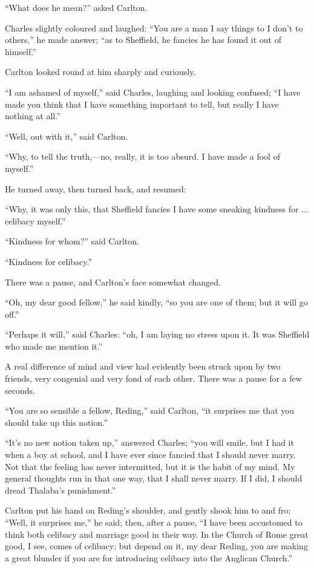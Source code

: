``What does he mean?'' asked Carlton.

Charles slightly coloured and laughed: ``You are a man I say
things to I don't to others,'' he made answer; ``as to
Sheffield, he fancies he has found it out of himself.''

Carlton looked round at him sharply and curiously.

``I am ashamed of myself,'' said Charles, laughing and
looking confused; ``I have made you think that I have something
important to tell, but really I have nothing at all.''

``Well, out with it,'' said Carlton.

``Why, to tell the truth,—no, really, it is too absurd. I
have made a fool of myself.''

He turned away, then turned back, and resumed:

``Why, it was only this, that Sheffield fancies I have some
sneaking kindness for ... celibacy myself.''

``Kindness for whom?'' said Carlton.

``Kindness for celibacy.''

There was a pause, and Carlton's face somewhat changed.

``Oh, my dear good fellow,'' he said kindly, ``so you
are one of them; but it will go off.''

``Perhaps it will,'' said Charles: ``oh, I am laying no
stress upon it. It was Sheffield who made me mention it.''

A real difference of mind and view had evidently been struck upon
by two friends, very congenial and very fond of each other. There was
a pause for a few seconds.

``You are so sensible a fellow, Reding,'' said Carlton,
``it surprises me that you should take up this notion.''

``It's no new notion taken up,'' answered Charles;
``you will smile, but I had it when a boy at school, and I have
ever since fancied that I should never marry. Not that the feeling has
never intermitted, but it is the habit of my mind. My general thoughts
run in that one way, that I shall never marry. If I did, I should
dread Thalaba's punishment.''

Carlton put his hand on Reding's shoulder, and gently shook him to
and fro; ``Well, it surprises me,'' he said; then, after a
pause, ``I have been accustomed to think both celibacy and
marriage good in their way. In the Church of Rome great good, I see,
comes of celibacy; but depend on it, my dear Reding, you are making a
great blunder if you are for introducing celibacy into the Anglican
Church.''

